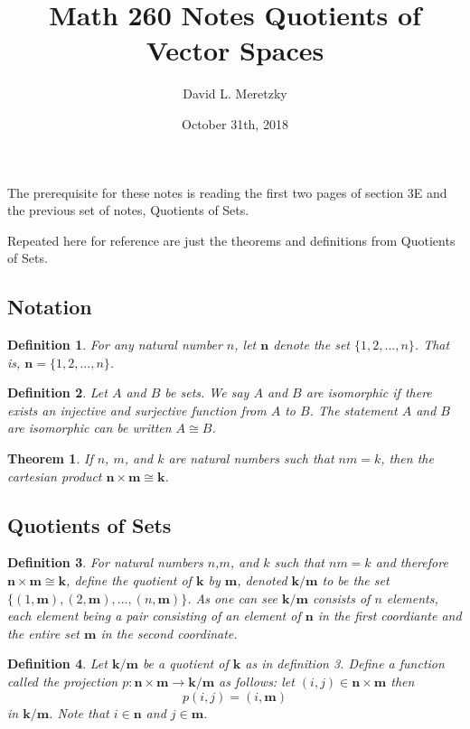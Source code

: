 \documentclass{article}
\title{ \vspace{-10ex} %
Math 260 Notes Quotients of Vector Spaces
}
\author{David L. Meretzky
}
\date{%
October 31th, 2018
}
\theoremstyle{problemstyle}
\newtheorem{theorem}{Theorem}
\newtheorem{definition}{Definition}
\begin{document}
\maketitle

The prerequisite for these notes is reading the first two pages of section 3E and the previous set of notes, Quotients of Sets. 

Repeated here for reference are just the theorems and definitions from Quotients of Sets. 

\subsection*{Notation}

\begin{definition}
For any natural number $n$, let $\textbf{n}$ denote the set $\{1,2,...,n\}$. That is, $\textbf{n} = \{1,2,...,n\}$. 
\end{definition}

\begin{definition}
Let $A$ and $B$ be sets.  We say $A$ and $B$ are isomorphic if there exists an injective and surjective function from $A$ to $B$. The statement $A$ and $B$ are isomorphic can be written $A \cong B$. 
\end{definition}

\begin{theorem}
If $n$, $m$, and $k$ are natural numbers such that $nm = k$, then the cartesian product $\textbf{n} \times \textbf{m} \cong \textbf{k}$. 
\end{theorem}

\subsection*{Quotients of Sets}

\begin{definition}
For natural numbers $n$,$m$, and $k$ such that $nm=k$ and therefore $\textbf{n} \times \textbf{m} \cong \textbf{k}$,  define the quotient of $\textbf{k}$ by $\textbf{m}$, denoted $\textbf{k/m}$ to be the set $\{(1,\textbf{m}),(2,\textbf{m}),...,(n,\textbf{m})\}$.  As one can see $\textbf{k/m}$ consists of $n$ elements, each element being a pair consisting of an element of $\textbf{n}$ in the first coordiante and the entire set $\textbf{m}$ in the second coordinate. 
\end{definition}

\begin{definition}
Let $\textbf{k/m}$ be a quotient of $\textbf{k}$ as in definition 3. Define a function called the projection $p:\textbf{n}\times\textbf{m} \rightarrow \textbf{k/m}$ as follows: let $(i,j) \in \textbf{n} \times \textbf{m}$ then $$p(i,j) = (i,\textbf{m})$$ in $\textbf{k/m}$. Note that $i \in \textbf{n}$ and $j \in \textbf{m}$. 
\end{definition}
\end{document}
